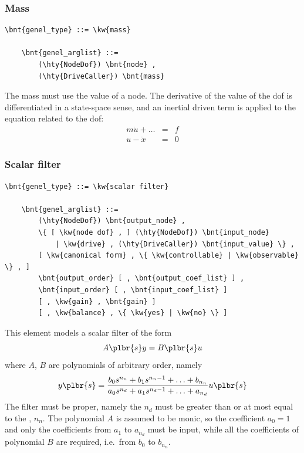 \subsubsection{Mass}
\label{sec:EL:GENEL:MASS}
\begin{Verbatim}[commandchars=\\\{\}]
    \bnt{genel_type} ::= \kw{mass}

    \bnt{genel_arglist} ::=
        (\hty{NodeDof}) \bnt{node} ,
        (\hty{DriveCaller}) \bnt{mass}
\end{Verbatim}
The mass must use the  value of a  node.
The derivative of the  value of
the dof is differentiated in a state-space sense, and an inertial driven
term is applied to the equation related to the dof:
\begin{eqnarray*}
        m\dot{u} + \ldots & = & f \\
	u - \dot{x} & = & 0
\end{eqnarray*}

\subsubsection{Scalar filter}
\label{sec:EL:GENEL:SCALAR-FILTER}
\begin{Verbatim}[commandchars=\\\{\}]
    \bnt{genel_type} ::= \kw{scalar filter}

    \bnt{genel_arglist} ::=
        (\hty{NodeDof}) \bnt{output_node} ,
        \{ [ \kw{node dof} , ] (\hty{NodeDof}) \bnt{input_node}
            | \kw{drive} , (\hty{DriveCaller}) \bnt{input_value} \} ,
        [ \kw{canonical form} , \{ \kw{controllable} | \kw{observable} \} , ]
        \bnt{output_order} [ , \bnt{output_coef_list} ] ,
        \bnt{input_order} [ , \bnt{input_coef_list} ]
        [ , \kw{gain} , \bnt{gain} ]
        [ , \kw{balance} , \{ \kw{yes} | \kw{no} \} ]
\end{Verbatim}
This element models a scalar filter of the form
\begin{displaymath}
    A\plbr{s}y = B\plbr{s}u
\end{displaymath}
where $ A $, $ B $ are polynomials of arbitrary order, namely
\begin{displaymath}
	y\plbr{s} = \frac{
		b_0 s^{n_n}
		+ b_1 s^{n_n-1}
		+ \ldots
		+ b_{n_n}
	}{
		a_0 s^{n_d}
		+ a_1 s^{n_d-1}
		+ \ldots
		+ a_{n_d}
	} u\plbr{s}
\end{displaymath}
The filter must be proper, namely the  $n_d$
must be greater than or at most equal to the , $n_n$.
The polynomial $ A $ is assumed to be monic, so the coefficient 
$a_0=1$ and only the coefficients from $a_1$ to $a_{n_d}$ must be input,
while all the coefficients of polynomial $ B $ are required,
i.e.\ from $b_0$ to $b_{n_n}$.

